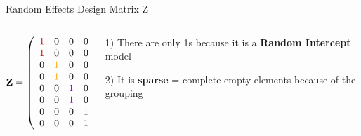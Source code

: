 \documentclass{beamer}
\begin{document}
\begin{frame}{Random Effects Design Matrix Z}
\begin{columns}
        \begin{column}{0.5\textwidth}
\[
\mathbf{Z} = \left( 
\begin{array}{cccc} 
\color{darkred}{1} & 0 & 0 & 0 \\ 
\color{darkred}{1} & 0 & 0 & 0 \\ 
0 & \color{orange}{1} & 0 & 0 \\ 
0 & \color{orange}{1} & 0 & 0 \\ 
0 & 0 & \color{violet}{1} & 0 \\ 
0 & 0 & \color{violet}{1} & 0 \\ 
0 & 0 & 0 & \color{darkgray}{1} \\ 
0 & 0 & 0 & \color{darkgray}{1} 
\end{array}\right)
\]
        \end{column}
        \begin{column}{0.5\textwidth}
        \large
            1) There are only 1s because it is a \textbf{Random Intercept} model \\
            \vspace{0.3cm}
            
            2) It is \textbf{sparse} = complete empty elements because of the grouping
        \end{column}
    \end{columns}

\end{frame}
\end{document}
